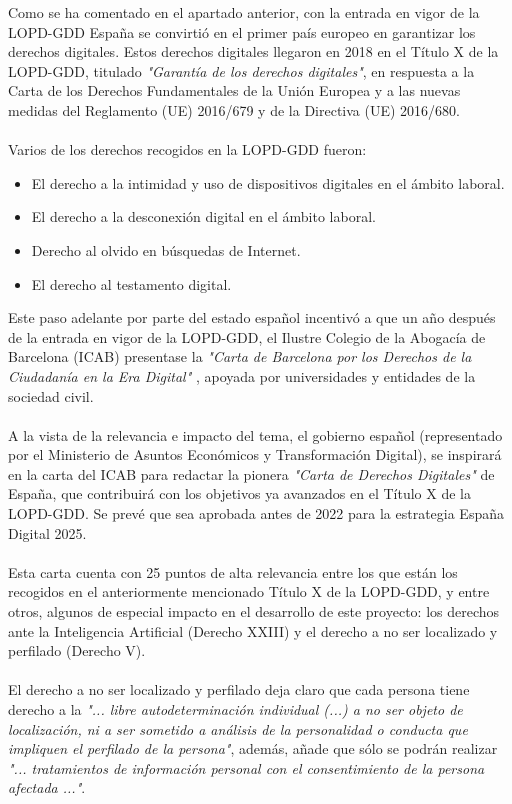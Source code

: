 \begin{refsection}
Como se ha comentado en el apartado anterior, con la entrada en vigor de la LOPD-GDD España se convirtió en el primer país europeo en garantizar los derechos digitales. Estos derechos digitales llegaron en 2018 en el Título X de la LOPD-GDD, titulado \textit{"Garantía de los derechos digitales"}, en respuesta a la Carta de los Derechos Fundamentales de la Unión Europea y a las nuevas medidas del Reglamento (UE) 2016/679 y de la Directiva (UE) 2016/680. 
\\ \\
Varios de los derechos recogidos en la LOPD-GDD fueron:
\begin{itemize}
  \item El derecho a la intimidad y uso de dispositivos digitales en el ámbito laboral.
  \item El derecho a la desconexión digital en el ámbito laboral.
  \item Derecho al olvido en búsquedas de Internet.
  \item El derecho al testamento digital.
\end{itemize}
Este paso adelante por parte del estado español incentivó a que un año después de la entrada en vigor de la LOPD-GDD, el Ilustre Colegio de la Abogacía de Barcelona (ICAB) presentase la \textit{"Carta de Barcelona por los Derechos de la Ciudadanía en la Era Digital"} \autocite{CartaBarcelonaPor}, apoyada por universidades y entidades de la sociedad civil. 
\\ \\
A la vista de la relevancia e impacto del tema, el gobierno español (representado por el Ministerio de Asuntos Económicos y Transformación Digital), se inspirará en la carta del ICAB para redactar la pionera \textit{"Carta de Derechos Digitales"} \autocite{CartaDerechosDigitales} de España, que contribuirá con los objetivos ya avanzados en el Título X de la LOPD-GDD. Se prevé que sea aprobada antes de 2022 para la estrategia España Digital 2025.
\\ \\
Esta carta cuenta con 25 puntos de alta relevancia entre los que están los recogidos en el anteriormente mencionado Título X de la LOPD-GDD, y entre otros, algunos de especial impacto en el desarrollo de este proyecto: los derechos ante la Inteligencia Artificial (Derecho XXIII) y el derecho a no ser localizado y perfilado (Derecho V). 
\\ \\
El derecho a no ser localizado y perfilado deja claro que cada persona tiene derecho a la \textit{"... libre autodeterminación individual (...) a no ser objeto de localización, ni a ser sometido a análisis de la personalidad o conducta que impliquen el perfilado de la persona"}, además, añade que sólo se podrán realizar \textit{"... tratamientos de información personal con el consentimiento de la persona afectada ..."}.

\end{refsection}
